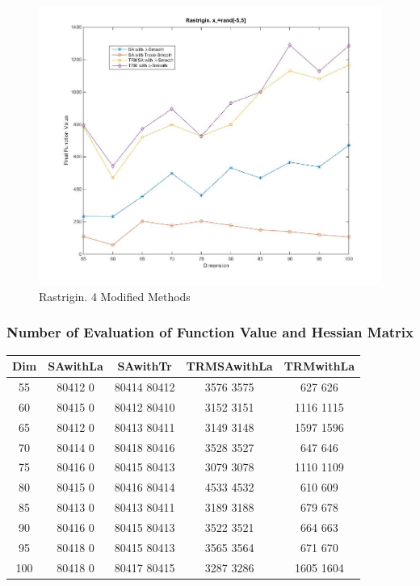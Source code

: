 \documentclass[hyperref={pdfpagelabels=false}]{beamer}
\begin{document}
\begin{frame}
\begin{figure}
\includegraphics[scale=0.25]{result7.jpg}
\caption{Rastrigin. 4 Modified Methods}
\end{figure}
\end{frame}


\begin{frame}
\frametitle{Number of Evaluation of Function Value and Hessian Matrix}
\begin{tabular}{c c c c c}
 Dim  &   SAwithLa   &     SAwithTr    &  TRMSAwithLa  &   TRMwithLa  \\ \hline
  55  &  80412    0  &  80414   80412  &  3576   3575  &   627    626 \\
  60  &  80415    0  &  80412   80410  &  3152   3151  &  1116   1115 \\
  65  &  80412    0  &  80413   80411  &  3149   3148  &  1597   1596 \\
  70  &  80414    0  &  80418   80416  &  3528   3527  &   647    646 \\
  75  &  80416    0  &  80415   80413  &  3079   3078  &  1110   1109 \\
  80  &  80415    0  &  80416   80414  &  4533   4532  &   610    609 \\
  85  &  80413    0  &  80413   80411  &  3189   3188  &   679    678 \\
  90  &  80416    0  &  80415   80413  &  3522   3521  &   664    663 \\
  95  &  80418    0  &  80415   80413  &  3565   3564  &   671    670 \\
 100  &  80418    0  &  80417   80415  &  3287   3286  &  1605   1604 

\end{tabular}
\end{frame}
\end{document}
